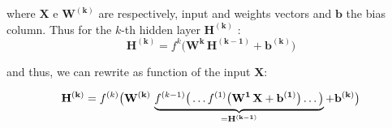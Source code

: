 \documentclass[a4,12pt]{article}
\begin{document}
 
where $\mathbf{X}$ e $\mathbf{W^{(k)}}$ are respectively, input and weights vectors and $\mathbf{b}$ the bias column. Thus for the $k$-th hidden layer $\mathbf{H^{(k)}}$ :
\begin{equation}
\mathbf{H^{(k)}}=f^k\big(\mathbf{W^{k}\,H^{(k-1)}}+\mathbf{b^{(k)}}\big)
\end{equation}

and thus, we can rewrite as function of the input $\mathbf{X}$:

\begin{equation}
\mathbf{H^{(k)}}=f^{(k)}\big(\mathbf{W^{(k)}}\,    \underbrace{f^{(k-1)} \big(	\dots f^{(1)}\big(\mathbf{W^{1}\,\mathbf{X}}+\mathbf{b^{(1)}}\big)\dots\big)}_%
{=\mathbf{H^{(k-1)}}}		 +\mathbf{b^{(k)}}\big)
\end {equation}
 
\end{document}
